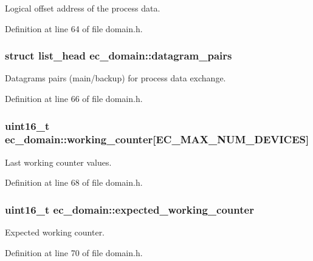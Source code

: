 Logical offset address of the process data. 



Definition at line 64 of file domain.\-h.

\subsubsection[{datagram\-\_\-pairs}]{\setlength{\rightskip}{0pt plus 5cm}struct list\-\_\-head ec\-\_\-domain\-::datagram\-\_\-pairs}\label{structec__domain_a9935943271eabfa9d5c68b5c19fe3bee}


Datagrams pairs (main/backup) for process data exchange. 



Definition at line 66 of file domain.\-h.

\subsubsection[{working\-\_\-counter}]{\setlength{\rightskip}{0pt plus 5cm}uint16\-\_\-t ec\-\_\-domain\-::working\-\_\-counter[E\-C\-\_\-\-M\-A\-X\-\_\-\-N\-U\-M\-\_\-\-D\-E\-V\-I\-C\-E\-S]}\label{structec__domain_a6f18a1d8c6b2a83acf3e5932a5f3048f}


Last working counter values. 



Definition at line 68 of file domain.\-h.

\subsubsection[{expected\-\_\-working\-\_\-counter}]{\setlength{\rightskip}{0pt plus 5cm}uint16\-\_\-t ec\-\_\-domain\-::expected\-\_\-working\-\_\-counter}\label{structec__domain_af978a94741ca2483ce0460e34c77271d}


Expected working counter. 



Definition at line 70 of file domain.\-h.

